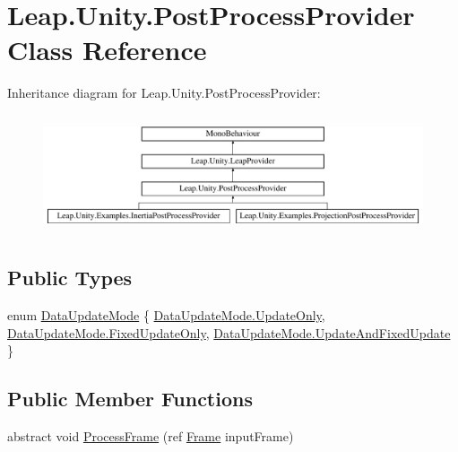\hypertarget{class_leap_1_1_unity_1_1_post_process_provider}{}\section{Leap.\+Unity.\+Post\+Process\+Provider Class Reference}
\label{class_leap_1_1_unity_1_1_post_process_provider}
Inheritance diagram for Leap.\+Unity.\+Post\+Process\+Provider\+:\begin{figure}[H]
\begin{center}
\leavevmode
\includegraphics[height=3.533123cm]{class_leap_1_1_unity_1_1_post_process_provider}
\end{center}
\end{figure}
\subsection*{Public Types}
\begin{DoxyCompactItemize}
\item 
enum \mbox{\hyperlink{class_leap_1_1_unity_1_1_post_process_provider_a00f92d69e8bdf46e32c5e8eda793e6c3}{Data\+Update\+Mode}} \{ \mbox{\hyperlink{class_leap_1_1_unity_1_1_post_process_provider_a00f92d69e8bdf46e32c5e8eda793e6c3a350c1257b699a10fa9f512f6e3b3a4fd}{Data\+Update\+Mode.\+Update\+Only}}, 
\mbox{\hyperlink{class_leap_1_1_unity_1_1_post_process_provider_a00f92d69e8bdf46e32c5e8eda793e6c3a5406fbe8cac450fd8a4d0e72cb2f1800}{Data\+Update\+Mode.\+Fixed\+Update\+Only}}, 
\mbox{\hyperlink{class_leap_1_1_unity_1_1_post_process_provider_a00f92d69e8bdf46e32c5e8eda793e6c3afb5c871e1319057021e998b3dceea97e}{Data\+Update\+Mode.\+Update\+And\+Fixed\+Update}}
 \}
\end{DoxyCompactItemize}
\subsection*{Public Member Functions}
\begin{DoxyCompactItemize}
\item 
abstract void \mbox{\hyperlink{class_leap_1_1_unity_1_1_post_process_provider_aa24a78b3485fd2bbac1d6370dd65ddbe}{Process\+Frame}} (ref \mbox{\hyperlink{class_leap_1_1_frame}{Frame}} input\+Frame)
\end{DoxyCompactItemize}
